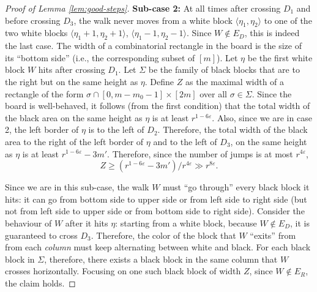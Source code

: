 \documentclass[10pt,a4paper]{article}
\theoremstyle{definition}%
\theoremstyle{plain}
\newcommand{\eps}{\varepsilon}
\begin{document}
\begin{proof}[Proof of Lemma \ref{lem:good-steps}]
\textbf{Sub-case 2:} At all times after crossing $D_1$ and before crossing $D_3$, the walk never moves from a
white block $\langle \eta_1, \eta_2 \rangle$ to one of the two white blocks $\langle\eta_1 + 1, \eta_2 + 1\rangle$, $\langle \eta_1 - 1, \eta_2 - 1\rangle$. Since $W \notin E_D$,
this is indeed the last case. The width of a combinatorial rectangle in the board is the size of its
“bottom side” (i.e., the corresponding subset of $[m]$). Let $\eta$ be the first white block $W$ hits after
crossing $D_1$. Let $\Sigma$ be the family of black blocks that are to the right but on the same height as $\eta$.
Define $Z$ as the maximal width of a rectangle of the form $\sigma \cap [0, m - m_0 - 1] \times [2m]$ over all $\sigma \in \Sigma$.
Since the board is well-behaved, it follows (from the first condition) that the
total width of the black area on the same height as $\eta$ is at least $r^{1-6\eps}$. Also, since we are in case 2, the left border of $\eta$ is to the left of $D_2$. Therefore, the
total width of the black area to the right of the left border of $\eta$ and to the
left of $D_3$, on the same height as $\eta$ is at least $r^{1-6\eps}- 3m'$. Therefore, since the number of jumps is at most $r^{4\eps}$,
\[
Z\geq (r^{1-6\eps}- 3m')/r^{4\eps} \gg r^{8\eps}.
\]

Since we are in this sub-case, the walk $W$ must “go through” every black block it hits: it can go from
bottom side to upper side or from left side to right side (but not from left side to upper side or
from bottom side to right side). Consider the behaviour of $W$ after it hits $\eta$: starting from a white block, because $W \notin E_D$, it is guaranteed to cross $D_3$. Therefore, the color of the block that $W$ ``exits'' from from each \emph{column} must keep alternating between white and black. For each black block in $\Sigma$, therefore, there exists
a black block in the same column that $W$ crosses horizontally. Focusing on one such black block
of width $Z$, since $W \notin E_R$, the claim holds.
\end{proof}
\end{document}

